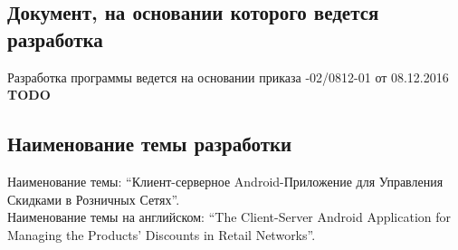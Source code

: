 \subsection{Документ, на основании которого ведется разработка}
Разработка программы ведется на основании приказа 
-02/0812-01 от 08.12.2016
\textbf{TODO}


\subsection{Наименование темы разработки}
Наименование темы: ``Клиент-серверное Android-Приложение для Управления Скидками в Розничных Сетях''. \\
Наименование темы на английском: ``The Client-Server Android Application for Managing the Products' Discounts in Retail Networks''. \\
